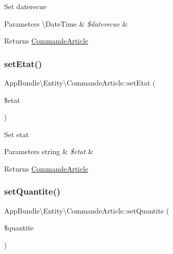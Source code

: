 Set daterecue


\begin{DoxyParams}[1]{Parameters}
\textbackslash{}\+Date\+Time & {\em \$daterecue} & \\
\hline
\end{DoxyParams}
\begin{DoxyReturn}{Returns}
\hyperlink{class_app_bundle_1_1_entity_1_1_commande_article}{Commande\+Article} 
\end{DoxyReturn}
\mbox{\label{class_app_bundle_1_1_entity_1_1_commande_article_a5cb0349e6c6e8172c910e7e345b7a1fe}} 
\subsubsection{\texorpdfstring{set\+Etat()}{setEtat()}}
{\footnotesize\ttfamily App\+Bundle\textbackslash{}\+Entity\textbackslash{}\+Commande\+Article\+::set\+Etat (\begin{DoxyParamCaption}\item[{}]{\$etat }\end{DoxyParamCaption})}

Set etat


\begin{DoxyParams}[1]{Parameters}
string & {\em \$etat} & \\
\hline
\end{DoxyParams}
\begin{DoxyReturn}{Returns}
\hyperlink{class_app_bundle_1_1_entity_1_1_commande_article}{Commande\+Article} 
\end{DoxyReturn}
\mbox{\label{class_app_bundle_1_1_entity_1_1_commande_article_af0b85fa0fe8ba6dd5e2b0d1a05163011}} 
\subsubsection{\texorpdfstring{set\+Quantite()}{setQuantite()}}
{\footnotesize\ttfamily App\+Bundle\textbackslash{}\+Entity\textbackslash{}\+Commande\+Article\+::set\+Quantite (\begin{DoxyParamCaption}\item[{}]{\$quantite }\end{DoxyParamCaption})}

